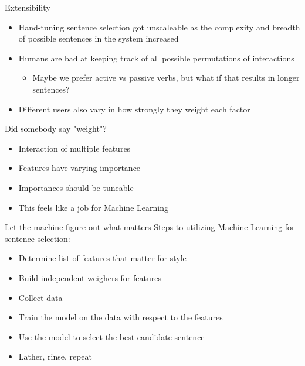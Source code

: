 \documentclass[10pt, compress]{beamer}		%
\begin{document}
\begin{frame}{Extensibility}
	\begin{itemize}
		\item Hand-tuning sentence selection got unscaleable as the complexity
            and breadth of possible sentences in the system increased
		\item Humans are bad at keeping track of all possible permutations of interactions \pause
		\begin{itemize}
			\item Maybe we prefer active vs passive verbs, but what if that results in longer sentences? \pause
		\end{itemize}
		\item Different users also vary in how strongly they weight each factor
	\end{itemize}
\end{frame}

\begin{frame}{Did somebody say "weight"?}
	\begin{itemize}
		\item Interaction of multiple features %
		\item Features have varying importance %
		\item Importances should be tuneable \pause %
		\item This feels like a job for Machine Learning
	\end{itemize}
\end{frame}

\begin{frame}{Let the machine figure out what matters}
	Steps to utilizing Machine Learning for sentence selection:

	\begin{itemize}
		\item Determine list of features that matter for style
		\item Build independent weighers for features
		\item Collect data
		\item Train the model on the data with respect to the features
		\item Use the model to select the best candidate sentence
		\item Lather, rinse, repeat
	\end{itemize}
\end{frame}
\end{document}
